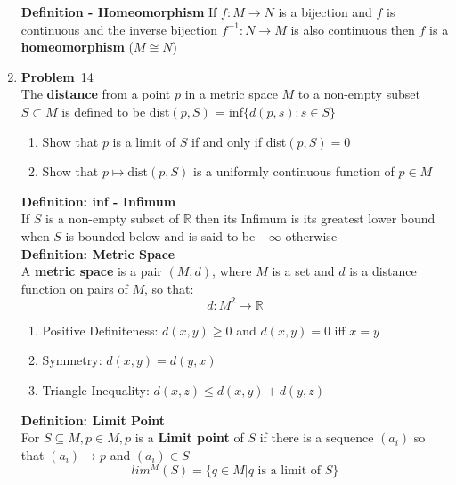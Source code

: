 \documentclass[12pt]{amsart}
\newcommand{\benu}{\begin{enumerate}}
\newcommand{\eenu}{\end{enumerate}}
\theoremstyle{definition}
\newcommand{\mbR}{\mathbb{R}}
\newcommand{\itep}{\item {\bfseries Problem}\ }
\begin{document}
\begin{enumerate}[series=p]
\textbf{Definition - Homeomorphism}
	If $f: M \to N$ is a bijection and $f$ is continuous and the inverse bijection $f^{-1}:N \to M$ is also continuous then $f$ is a \textbf{homeomorphism}
	($M \cong N$)
\newpage

\itep  14\\
The \textbf{distance} from a point $p$ in a metric space $M$ to a non-empty subset $S \subset M$ is defined to be dist$(p, S)$ = inf$\{d(p,s) : s \in S\}$
\\
\benu
\item Show that $p$ is a limit of $S$ if and only if dist$(p, S) = 0$
\item Show that $p \mapsto \text{dist}(p, S)$ is a uniformly continuous function of $p \in M$
\eenu
\textbf{Definition: inf - Infimum}\\
If $S$ is a non-empty subset of $\mbR$ then its Infimum is its greatest lower bound when $S$ is bounded below and is said to be $-\infty$ otherwise\\
\textbf{Definition: Metric Space}\\
A \textbf{metric space} is a pair $(M, d)$, where $M$ is a set and $d$ is a distance function on pairs of $M$, so that:
$$d: M^2 \to \mbR$$
\benu
\item Positive Definiteness: $d(x,y) \geq 0$ and $d(x,y) = 0$ iff $x = y$
\item Symmetry: $d(x,y) = d(y,x)$
\item Triangle Inequality: $d(x,z) \leq d(x,y) + d(y,z)$
\eenu
\textbf{Definition: Limit Point}\\
	For $S \subseteq M, p \in M, p$ is a \textbf{Limit point} of $S$ if there is a sequence $(a_i)$ so that $(a_i) \to p$ and $(a_i) \in S$
$$lim^M(S) = \{q \in M|q \text{ is a limit of }S\}$$

\newpage


\end{enumerate}
\end{document}
